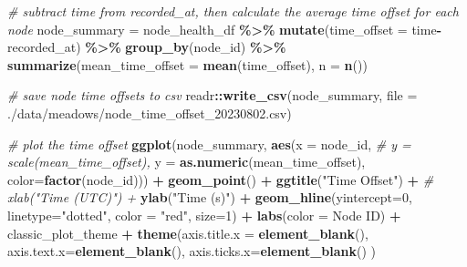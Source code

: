 \documentclass[
]{book}
\newenvironment{Shaded}{\begin{snugshade}}{\end{snugshade}}
\newcommand{\AttributeTok}[1]{\textcolor[rgb]{0.13,0.29,0.53}{#1}}
\newcommand{\CommentTok}[1]{\textcolor[rgb]{0.56,0.35,0.01}{\textit{#1}}}
\newcommand{\DecValTok}[1]{\textcolor[rgb]{0.00,0.00,0.81}{#1}}
\newcommand{\FunctionTok}[1]{\textcolor[rgb]{0.13,0.29,0.53}{\textbf{#1}}}
\newcommand{\NormalTok}[1]{#1}
\newcommand{\OtherTok}[1]{\textcolor[rgb]{0.56,0.35,0.01}{#1}}
\newcommand{\SpecialCharTok}[1]{\textcolor[rgb]{0.81,0.36,0.00}{\textbf{#1}}}
\newcommand{\StringTok}[1]{\textcolor[rgb]{0.31,0.60,0.02}{#1}}
\begin{document}
\begin{Shaded}
\begin{Highlighting}[]
\CommentTok{\# subtract time from recorded\_at, then calculate the average time offset for each node}
\NormalTok{node\_summary }\OtherTok{=}\NormalTok{ node\_health\_df }\SpecialCharTok{\%\textgreater{}\%}
  \FunctionTok{mutate}\NormalTok{(}\AttributeTok{time\_offset =}\NormalTok{ time}\SpecialCharTok{{-}}\NormalTok{recorded\_at) }\SpecialCharTok{\%\textgreater{}\%}
  \FunctionTok{group\_by}\NormalTok{(node\_id) }\SpecialCharTok{\%\textgreater{}\%}
  \FunctionTok{summarize}\NormalTok{(}\AttributeTok{mean\_time\_offset =} \FunctionTok{mean}\NormalTok{(time\_offset), }\AttributeTok{n =} \FunctionTok{n}\NormalTok{())}

\CommentTok{\# save node time offsets to csv}
\NormalTok{readr}\SpecialCharTok{::}\FunctionTok{write\_csv}\NormalTok{(node\_summary,}
                 \AttributeTok{file =} \StringTok{\textquotesingle{}./data/meadows/node\_time\_offset\_20230802.csv\textquotesingle{}}\NormalTok{)}

\CommentTok{\# plot the time offset}
\FunctionTok{ggplot}\NormalTok{(node\_summary,}
       \FunctionTok{aes}\NormalTok{(}\AttributeTok{x =}\NormalTok{ node\_id, }
           \CommentTok{\# y = scale(mean\_time\_offset),}
           \AttributeTok{y =} \FunctionTok{as.numeric}\NormalTok{(mean\_time\_offset),}
           \AttributeTok{color=}\FunctionTok{factor}\NormalTok{(node\_id))) }\SpecialCharTok{+}
  \FunctionTok{geom\_point}\NormalTok{() }\SpecialCharTok{+}
  \FunctionTok{ggtitle}\NormalTok{(}\StringTok{"Time Offset"}\NormalTok{) }\SpecialCharTok{+}
  \CommentTok{\# xlab("Time (UTC)") +}
  \FunctionTok{ylab}\NormalTok{(}\StringTok{"Time (s)"}\NormalTok{) }\SpecialCharTok{+}
  \FunctionTok{geom\_hline}\NormalTok{(}\AttributeTok{yintercept=}\DecValTok{0}\NormalTok{, }
             \AttributeTok{linetype=}\StringTok{"dotted"}\NormalTok{, }
             \AttributeTok{color =} \StringTok{"red"}\NormalTok{, }
             \AttributeTok{size=}\DecValTok{1}\NormalTok{) }\SpecialCharTok{+}
  \FunctionTok{labs}\NormalTok{(}\AttributeTok{color =} \StringTok{\textquotesingle{}Node ID\textquotesingle{}}\NormalTok{) }\SpecialCharTok{+}
\NormalTok{  classic\_plot\_theme }\SpecialCharTok{+}
  \FunctionTok{theme}\NormalTok{(}\AttributeTok{axis.title.x =} \FunctionTok{element\_blank}\NormalTok{(),}
        \AttributeTok{axis.text.x=}\FunctionTok{element\_blank}\NormalTok{(),}
        \AttributeTok{axis.ticks.x=}\FunctionTok{element\_blank}\NormalTok{()}
\NormalTok{        )}
\end{Highlighting}
\end{Shaded}
\end{document}

